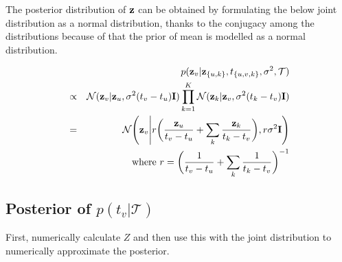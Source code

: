 \documentclass{article}
\begin{document}
	The posterior distribution of $\bold{z}$ can be obtained by formulating the below joint distribution as a normal distribution, thanks to the conjugacy among the distributions because of that the prior of mean is modelled as a normal distribution.

	\begin{eqnarray}
	& & p(\bold{z}_v | \bold{z}_{\{u, k\}}, t_{\{u, v, k\}}, \sigma^2, \mathcal{T}) \nonumber \\
	&\propto &
	\mathcal{N}(\bold{z}_v | \bold{z}_u, \sigma^2(t_v - t_u)\bold{I})
	\prod^{K}_{k=1} \mathcal{N}(\bold{z}_k | \bold{z}_v, \sigma^2(t_k - t_v)\bold{I}) \nonumber \\
	&=& \mathcal{N} \Bigg( \bold{z}_v \Bigg| r \bigg( \frac{\bold{z}_u}{t_v - t_u} + \sum_k \frac{\bold{z}_k}{t_k - t_v} \bigg), r\sigma^2\bold{I} \Bigg) \nonumber \\
	& & \textrm{where } r = \bigg( \frac{1}{t_v - t_u} + \sum_k \frac{1}{t_k - t_v} \bigg)^{-1} \nonumber
	\end{eqnarray}

	\subsection{Posterior of $p(t_v | \mathcal{T})$}	
	First, numerically calculate $Z$ and then use this with the joint distribution to numerically approximate the posterior.
	
\end{document}
